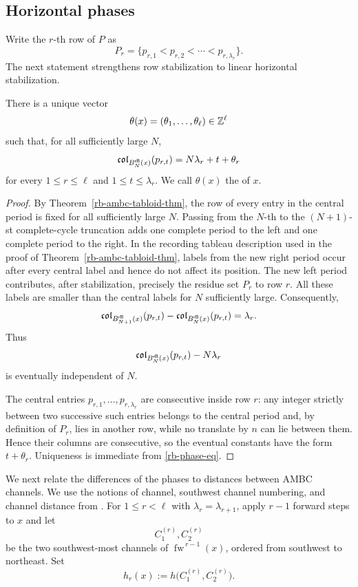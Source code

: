 \documentclass[11pt]{article}
\begin{document}
\subsection{Horizontal phases}

Write the $r$-th row of $P$ as
\[
P_r=\{p_{r,1}<p_{r,2}<\cdots<p_{r,\lambda_r}\}.
\]
The next statement strengthens row stabilization to linear horizontal
stabilization.

\begin{proposition}
\label{rb-phase-existence-prop}
There is a unique vector
\[
\theta(x)=(\theta_1,\ldots,\theta_{\ell})\in\mathbb{Z}^{\ell}
\]
such that, for all sufficiently large $N$,
\begin{equation}
\label{rb-phase-eq}
\mathfrak{col}_{B^{\mathsf{rB}}_N(x)}(p_{r,t})
=
N\lambda_r+t+\theta_r
\end{equation}
for every $1\leq r\leq\ell$ and
$1\leq t\leq\lambda_r$.
We call $\theta(x)$ the  of $x$.
\end{proposition}

\begin{proof}
By Theorem~\ref{rb-ambc-tabloid-thm}, the row of every entry in the
central period is fixed for all sufficiently large $N$.  Passing from the
$N$-th to the $(N+1)$-st complete-cycle truncation adds one complete
period to the left and one complete period to the right.  In the recording
tableau description used in the proof of
Theorem~\ref{rb-ambc-tabloid-thm}, labels from the new right period occur
after every central label and hence do not affect its position.  The new
left period contributes, after stabilization, precisely the residue set
$P_r$ to row $r$.  All these labels are smaller than the central labels
for $N$ sufficiently large.  Consequently,
\[
\mathfrak{col}_{B^{\mathsf{rB}}_{N+1}(x)}(p_{r,t})
-
\mathfrak{col}_{B^{\mathsf{rB}}_N(x)}(p_{r,t})
=
\lambda_r.
\]
Thus
\[
\mathfrak{col}_{B^{\mathsf{rB}}_N(x)}(p_{r,t})-N\lambda_r
\]
is eventually independent of $N$.

The central entries $p_{r,1},\ldots,p_{r,\lambda_r}$ are consecutive
inside row $r$: any integer strictly between two successive such entries
belongs to the central period and, by definition of $P_r$, lies in another
row, while no translate by $n$ can lie between them.  Hence their columns
are consecutive, so the eventual constants have the form
$t+\theta_r$.  Uniqueness is immediate from \eqref{rb-phase-eq}.
\end{proof}

We next relate the differences of the phases to distances between AMBC
channels.  We use the notions of channel, southwest channel numbering,
and channel distance from \cite[Sections~3.3 and~3.4]{CPY}.  For
$1\leq r<\ell$ with $\lambda_r=\lambda_{r+1}$, apply $r-1$ forward steps
to $x$ and let
\[
C_1^{(r)},C_2^{(r)}
\]
be the two southwest-most channels of $\operatorname{fw}^{\,r-1}(x)$, ordered from
southwest to northeast.  Set
\[
h_r(x):=h\bigl(C_1^{(r)},C_2^{(r)}\bigr).
\]
\end{document}

